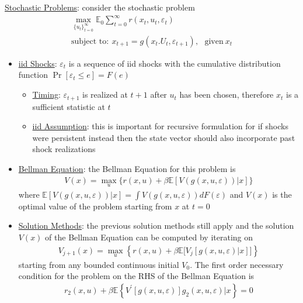 \documentclass{article}
\begin{document}
\vspace{2.5mm}
\par \underline{Stochastic Problems}: consider the stochastic problem
\begin{gather*}
\max_{\{ u_{t} \} ^{\infty}_{t=0}} \mathbb{E}_{0} \sum_{t=0}^{\infty} r(x_{t}, u_{t}, \varepsilon_{t})\\
\text{subject to}: \ x_{t+1} = g(x_{t}. U_{t}, \varepsilon_{t+1}), \ \ \ \text{given} \ x_{t}
\end{gather*}
\begin{itemize}
    \item  \underline{iid Shocks}: $\varepsilon_{t}$ is a sequence of iid shocks with the cumulative distribution function $\Pr [\varepsilon_{t} \leq e ] = F(e)$
    \begin{itemize}
        \item \underline{Timing}: $\varepsilon_{t+1}$ is realized at $t+1$ after $u_{t}$ has been chosen, therefore $x_{t}$ is a sufficient statistic at $t$
        \item \underline{iid Assumption}: this is important for recursive formulation for if shocks were persistent instead then the state vector should also incorporate past shock realizations
    \end{itemize}
    \item \underline{Bellman Equation}: the Bellman Equation for this problem is
    \begin{gather*}
        V(x) = \max_{u} \{ r(x,u) + \beta \mathbb{E}[V(g(x,u, \varepsilon))|x] \}
    \end{gather*}
    where $\mathbb{E} [V(g(x, u, \varepsilon))|x ] = \int V(g(x,u,\varepsilon))dF(\varepsilon)$ and $V(x)$ is the optimal value of the problem starting from $x$ at $t=0$
    \item \underline{Solution Methods}: the previous solution methods still apply and the solution $V(x)$ of the Bellman Equation can be computed by iterating on
    \begin{gather*}
        V_{j+1}(x) = \max_{u} \left\{r(x,u) + \beta \mathbb{E} \bigg[ V_{j}[g(x,u,\varepsilon) | x] \bigg] \right\}
    \end{gather*}
    starting from any bounded continuous initial $V_{0}$.
    The first order necessary condition for the problem on the RHS of the Bellman Equation is
    \begin{gather*}
        r_{2}(x,u) + \beta \mathbb{E} \left\{V^{'} [g (x, u, \varepsilon)] g_{2}(x,u,\varepsilon) | x \right\} = 0
    \end{gather*}

\end{itemize}
\end{document}
